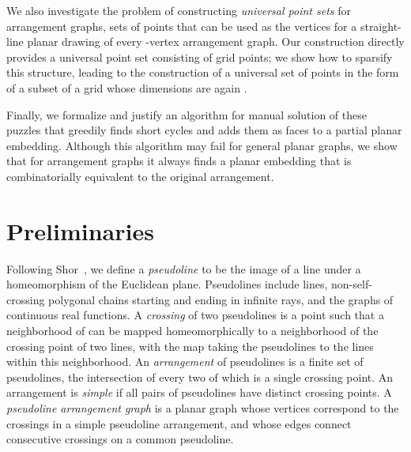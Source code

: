 \documentclass[oribibl]{llncs}
\begin{document}
We also investigate the problem of constructing \emph{universal point sets} for arrangement graphs, sets of points that can be used as the vertices for a straight-line planar drawing of every -vertex arrangement graph. Our construction directly provides a universal point set consisting of  grid points; we show how to sparsify this structure, leading to the construction of a universal set of  points in the form of a subset of a grid whose dimensions are again .

Finally, we formalize and justify an algorithm for manual solution of these puzzles that greedily finds short cycles and adds them as faces to a partial planar embedding. Although this algorithm may fail for general planar graphs, we show that for arrangement graphs it always finds a planar embedding that is combinatorially equivalent to the original arrangement.

\section{Preliminaries}


Following Shor~\cite{Sho-VKF-91}, we define a \emph{pseudoline} to be the image of a line under a homeomorphism of the Euclidean plane. Pseudolines include lines, non-self-crossing polygonal chains starting and ending in infinite rays, and the graphs of continuous real functions. A \emph{crossing} of two pseudolines is a point  such that a neighborhood of  can be mapped homeomorphically to a neighborhood of the crossing point of two lines, with the map taking the pseudolines to the lines within this neighborhood. An \emph{arrangement} of pseudolines is a finite set of pseudolines, the intersection of every two of which is a single crossing point. An arrangement is \emph{simple} if all pairs of pseudolines have distinct crossing points. A \emph{pseudoline arrangement graph} is a planar graph whose vertices correspond to the crossings in a simple pseudoline arrangement, and whose edges connect consecutive crossings on a common pseudoline.
\end{document}
